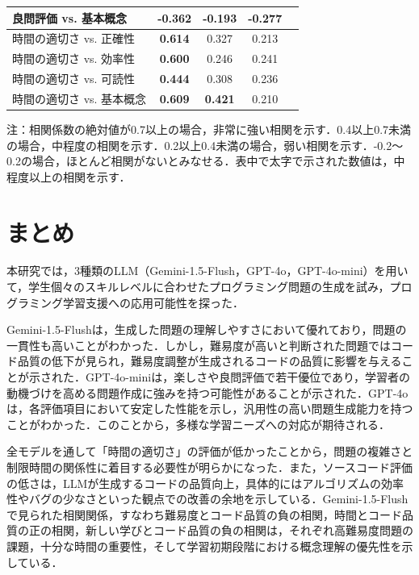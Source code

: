 \documentclass[11pt]{jreport}
\begin{document}
\begin{table}[t]
\begin{threeparttable}
\begin{tabular}{lcccc}
      良問評価 vs. 基本概念 & -0.362 & -0.193 & -0.277 \\
      \hline
      時間の適切さ vs. 正確性 & \textbf{0.614} & 0.327 & 0.213 \\
      時間の適切さ vs. 効率性 & \textbf{0.600} & 0.246 & 0.241 \\
      時間の適切さ vs. 可読性 & \textbf{0.444} & 0.308 & 0.236 \\
      時間の適切さ vs. 基本概念 & \textbf{0.609} & \textbf{0.421} & 0.210 \\
      \hline
    \end{tabular}
    \begin{tablenotes}
      \small
      \item 注：相関係数の絶対値が0.7以上の場合，非常に強い相関を示す．0.4以上0.7未満の場合，中程度の相関を示す．0.2以上0.4未満の場合，弱い相関を示す．-0.2〜0.2の場合，ほとんど相関がないとみなせる．表中で太字で示された数値は，中程度以上の相関を示す．
    \end{tablenotes}
  \end{threeparttable}
\end{table}



\chapter{まとめ}

本研究では，3種類のLLM（Gemini-1.5-Flush，GPT-4o，GPT-4o-mini）を用いて，学生個々のスキルレベルに合わせたプログラミング問題の生成を試み，プログラミング学習支援への応用可能性を探った．

Gemini-1.5-Flushは，生成した問題の理解しやすさにおいて優れており，問題の一貫性も高いことがわかった．しかし，難易度が高いと判断された問題ではコード品質の低下が見られ，難易度調整が生成されるコードの品質に影響を与えることが示された．GPT-4o-miniは，楽しさや良問評価で若干優位であり，学習者の動機づけを高める問題作成に強みを持つ可能性があることが示された．GPT-4oは，各評価項目において安定した性能を示し，汎用性の高い問題生成能力を持つことがわかった．このことから，多様な学習ニーズへの対応が期待される．

全モデルを通して「時間の適切さ」の評価が低かったことから，問題の複雑さと制限時間の関係性に着目する必要性が明らかになった．また，ソースコード評価の低さは，LLMが生成するコードの品質向上，具体的にはアルゴリズムの効率性やバグの少なさといった観点での改善の余地を示している．Gemini-1.5-Flushで見られた相関関係，すなわち難易度とコード品質の負の相関，時間とコード品質の正の相関，新しい学びとコード品質の負の相関は，それぞれ高難易度問題の課題，十分な時間の重要性，そして学習初期段階における概念理解の優先性を示している．
\end{document}
